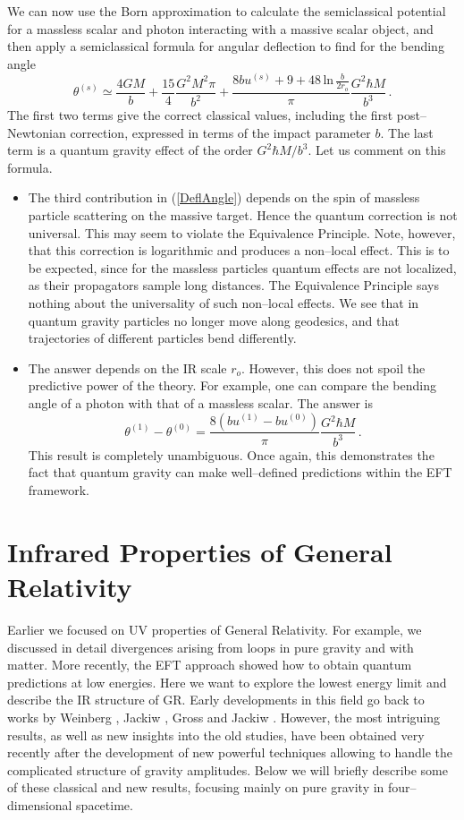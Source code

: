 \documentclass[12pt]{article}
\newcommand{\be}{\begin{equation}}
\newcommand{\ee}{\end{equation}}
\begin{document}
We can now use the Born approximation to calculate the semiclassical potential for a massless scalar and photon interacting with a massive scalar object, and then apply a semiclassical formula for angular deflection to find for the bending angle
\be \label{DeflAngle}
\theta^{(s)}\simeq \dfrac{4GM}{b}+\dfrac{15}{4}\dfrac{G^2M^2\pi}{b^2}+\dfrac{8bu^{(s)}+9+48\,\text{ln}\, \frac{b}{2r_o}}{\pi}\dfrac{G^2\hbar M}{b^3}\,.
\ee
The first two terms give the correct classical values, including the first post--Newtonian correction, expressed in terms of the impact parameter $b$. The last term is a quantum gravity effect of the order $G^2\hbar M/b^3$. Let us comment on this formula.
\begin{itemize}
\item The third contribution in (\ref{DeflAngle}) depends on the spin of massless particle scattering on the massive target. Hence the quantum correction is not universal. This may seem to violate the Equivalence Principle. Note, however, that this correction is logarithmic and produces a non--local effect. This is to be expected, since for the massless particles quantum effects are not localized, as their propagators sample long distances. The Equivalence Principle says nothing about the universality of such non--local effects. We see that in quantum gravity particles no longer move along geodesics, and that trajectories of different particles bend differently.
\item The answer depends on the IR scale $r_o$. However, this does not spoil the predictive power of the theory. For example, one can compare the bending angle of a photon with that of a massless scalar. The answer is
\be
\theta^{(1)}-\theta^{(0)}=\dfrac{8(bu^{(1)}-bu^{(0)})}{\pi}\dfrac{G^2\hbar M}{b^3}\,.
\ee
This result is completely unambiguous.
Once again, this demonstrates the fact that quantum gravity can make well--defined predictions within the EFT framework.
\end{itemize}

\section{Infrared Properties of General Relativity}
\label{sec:ir}

Earlier we focused on UV properties of General Relativity. For example, we discussed in detail divergences arising from loops in pure gravity and with matter. More recently, the EFT approach showed how to obtain quantum predictions at low energies. Here we want to explore the lowest energy limit and describe the IR structure of GR. Early developments in this field go back to works by Weinberg \cite{Weinberg:1965nx}, Jackiw \cite{Jackiw:1968zza}, Gross and Jackiw \cite{Gross:1968in}. However, the most intriguing results, as well as new insights into the old studies, have been obtained very recently after the development of new powerful techniques allowing to handle the complicated structure of gravity amplitudes. Below we will briefly describe some of these classical and new results, focusing mainly on pure gravity in four--dimensional spacetime.
\end{document}
